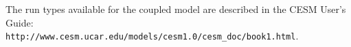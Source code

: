 
The run types available for the coupled model are described in the CESM
User's Guide:\\

      {\tt http://www.cesm.ucar.edu/models/cesm1.0/cesm\_doc/book1.html}.\\

